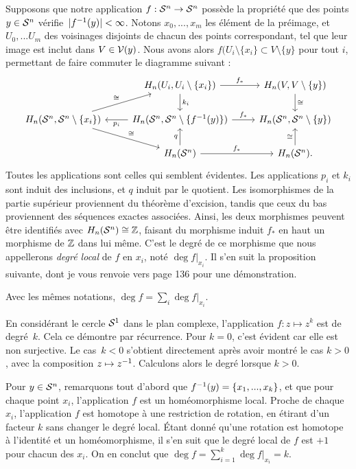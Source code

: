 Supposons que notre application $f:\mathcal{S}^{n}\to \mathcal{S}^{n}$ possède la propriété que des points $y\in\mathcal{S}^{n}$ vérifie~$|f^{-1}(y)|<\infty$. Notons $x_0,...,x_m$ les élément de la préimage, et $U_0,...U_m$ des voisinages disjoints de chacun des points correspondant, tel que leur image est inclut dans $V\in\mathcal{V}(y)$. Nous avons alors $f(U_i\setminus\{x_i\}\subset V\setminus\{y\}$ pour tout $i$, permettant de faire commuter le diagramme suivant :\[\begin{tikzcd}
&H_n(U_i,U_i\setminus\{x_i\})\arrow[r,"f_\ast"]\arrow[d,"k_i"]&H_n(V,V\setminus\{y\})\arrow[d,"\cong"]\\
H_n(\s{n},\s{n}\setminus\{x_i\})\arrow[ur, "\cong"]\arrow[dr,"\cong"]&H_n(\s{n},\s{n}\setminus\{f\inv(y)\})\arrow[l,"p_i"]\arrow[r,"f_\ast"]&H_n(\s{n},\s{n}\setminus\{y\})\\
&H_n(\s{n})\arrow[u,"q"]\arrow[r,"f_\ast"]&H_n(\s{n}).\arrow[u,"\cong"]
\end{tikzcd}\]Toutes les applications sont celles qui semblent évidentes. Les applications $p_i$ et $k_i$ sont induit des inclusions, et $q$ induit par le quotient. Les isomorphismes de la partie supérieur proviennent du théorème d'excision, tandis que ceux du bas  proviennent des séquences exactes associées. Ainsi, les deux morphismes peuvent être identifiés avec $H_n(\mathcal{S}^{n})\cong \mathbb{Z}$, faisant du morphisme induit $f_\ast$ en haut un morphisme de $\mathbb{Z}$ dans lui même. C'est le degré de ce morphisme que nous appellerons \emph{degré local} de $f$ en $x_i$, noté $\deg f|_{x_i}$. Il s'en suit la proposition suivante, dont je vous renvoie vers \cite{Hatcher} page 136 pour une démonstration.

\begin{proposition}
Avec les mêmes notations, $\deg f=\sum_i\deg f|_{x_i}$.
\end{proposition}

\begin{exemple}
En considérant le cercle $\mathcal{S}^{1}$ dans le plan complexe, l'application $f:z\mapsto z^k$ est de degré~$k$. Cela ce démontre par récurrence. Pour $k=0$, c'est évident car elle est non surjective. Le cas~$k<0$ s'obtient directement après avoir montré le cas $k>0$, avec la composition $z\mapsto z^{-1}$. Calculons alors le degré lorsque $k>0$.

Pour $y\in\mathcal{S}^{n}$, remarquons tout d'abord que $f^{-1}(y)=\{x_1,...,x_k\}$, et que pour chaque point $x_i$, l'application $f$ est un homéomorphisme local. Proche de chaque $x_i$, l'application $f$ est homotope à une restriction de rotation, en étirant d'un facteur $k$ sans changer le degré local. Étant donné qu'une rotation est homotope à l'identité et un homéomorphisme, il s'en suit que le degré local de $f$ est $+1$ pour chacun des $x_i$. On en conclut que $\deg f=\sum_{i=1}^k\deg f|_{x_i}=k$.
\end{exemple}

